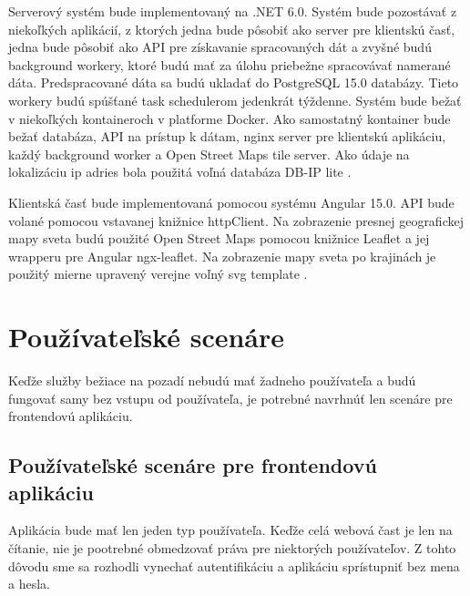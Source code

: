 Serverový systém bude implementovaný na .NET 6.0. Systém bude pozostávať z niekoľkých aplikácií, z ktorých jedna bude pôsobiť ako 
server pre klientskú časť, jedna bude pôsobiť ako API pre získavanie spracovaných dát a zvyšné budú background workery, ktoré budú mať za úlohu
priebežne spracovávať namerané dáta. Predspracované dáta sa budú ukladať do PostgreSQL 15.0 databázy. Tieto workery budú spúšťané task schedulerom
jedenkrát týždenne. Systém bude bežať v niekoľkých kontaineroch v platforme Docker. Ako samostatný kontainer bude bežať databáza, API na prístup k 
dátam, nginx server pre klientskú aplikáciu, každý background worker a Open Street Maps tile server. Ako údaje na lokalizáciu ip adries bola 
použitá voľná databáza DB-IP lite \cite{ip_city_db}.

Klientská časť bude implementovaná pomocou systému Angular 15.0. API bude volané pomocou vstavanej knižnice httpClient. Na zobrazenie 
presnej geografickej mapy sveta budú použité Open Street Maps pomocou knižnice Leaflet a jej wrapperu pre Angular ngx-leaflet. Na zobrazenie 
mapy sveta po krajinách je použitý mierne upravený verejne voľný svg template \cite{svg_mapa}.

\section{Používateľské scenáre}
Keďže služby bežiace na pozadí nebudú mať žadneho používateľa a budú fungovať samy bez vstupu od používateľa, je potrebné navrhnúť len scenáre 
pre frontendovú aplikáciu.

\subsection{Používateľské scenáre pre frontendovú aplikáciu}
Aplikácia bude mať len jeden typ používateľa. Keďže celá webová čast je len na čítanie, nie je pootrebné obmedzovať práva pre niektorých používateľov. 
Z tohto dôvodu sme sa rozhodli vynechať autentifikáciu a aplikáciu sprístupniť bez mena a hesla.

